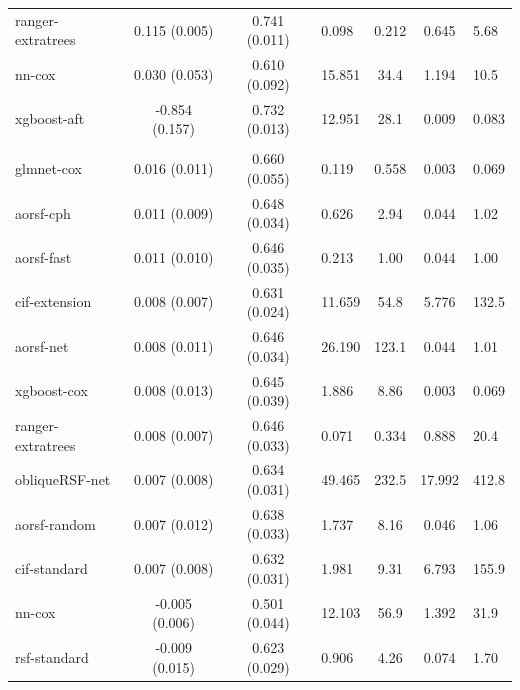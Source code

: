 \documentclass[twoside,11pt]{article}\usepackage[]{graphicx}\usepackage[]{xcolor}
\newenvironment{knitrout}{}{} %
\begin{document}
\begin{knitrout}
\begin{longtable}{lcclccl}
\hspace{1em}ranger-extratrees & 0.115 (0.005) & 0.741 (0.011) & 0.098 & 0.212 & 0.645 & 5.68\\
\hspace{1em}nn-cox & 0.030 (0.053) & 0.610 (0.092) & 15.851 & 34.4 & 1.194 & 10.5\\
\hspace{1em}xgboost-aft & -0.854 (0.157) & 0.732 (0.013) & 12.951 & 28.1 & 0.009 & 0.083\\
\addlinespace[0.3em]
\hline
\multicolumn{7}{l}{\textit{\textbf{Monoclonal gammopathy; malignancy, n = 1384, p = 8}}}\\
\hline
\hspace{1em}glmnet-cox & 0.016 (0.011) & 0.660 (0.055) & 0.119 & 0.558 & 0.003 & 0.069\\
\hspace{1em}aorsf-cph & 0.011 (0.009) & 0.648 (0.034) & 0.626 & 2.94 & 0.044 & 1.02\\
\hspace{1em}aorsf-fast & 0.011 (0.010) & 0.646 (0.035) & 0.213 & 1.00 & 0.044 & 1.00\\
\hspace{1em}cif-extension & 0.008 (0.007) & 0.631 (0.024) & 11.659 & 54.8 & 5.776 & 132.5\\
\hspace{1em}aorsf-net & 0.008 (0.011) & 0.646 (0.034) & 26.190 & 123.1 & 0.044 & 1.01\\
\hspace{1em}xgboost-cox & 0.008 (0.013) & 0.645 (0.039) & 1.886 & 8.86 & 0.003 & 0.069\\
\hspace{1em}ranger-extratrees & 0.008 (0.007) & 0.646 (0.033) & 0.071 & 0.334 & 0.888 & 20.4\\
\hspace{1em}obliqueRSF-net & 0.007 (0.008) & 0.634 (0.031) & 49.465 & 232.5 & 17.992 & 412.8\\
\hspace{1em}aorsf-random & 0.007 (0.012) & 0.638 (0.033) & 1.737 & 8.16 & 0.046 & 1.06\\
\hspace{1em}cif-standard & 0.007 (0.008) & 0.632 (0.031) & 1.981 & 9.31 & 6.793 & 155.9\\
\hspace{1em}nn-cox & -0.005 (0.006) & 0.501 (0.044) & 12.103 & 56.9 & 1.392 & 31.9\\
\hspace{1em}rsf-standard & -0.009 (0.015) & 0.623 (0.029) & 0.906 & 4.26 & 0.074 & 1.70\\

\end{longtable}
\end{knitrout}
\end{document}
